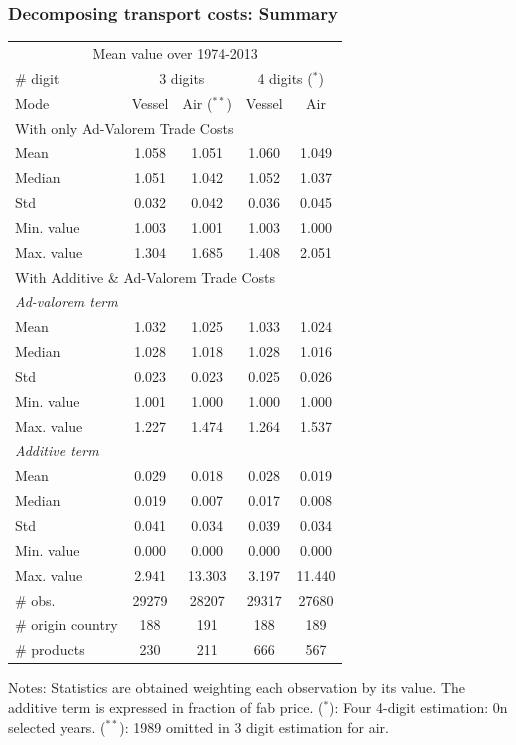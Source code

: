 \documentclass[10 pt,Helvetica, french]{beamer}
\begin{document}
\begin{frame}[label=app_results_summary]
\frametitle{Decomposing transport costs: Summary \hyperlink{slide_results_summary}{}}
\begin{table}[htbp]
  \centering
  \scriptsize{
  \begin{center}
    \begin{tabular}{l|cc|cc}
      \hline \hline
    \multicolumn{5}{c}{Mean value over 1974-2013}   \\
    \# digit & \multicolumn{2}{c}{3 digits} & \multicolumn{2}{c}{4 digits ($^\ast$)} \\ \hline
    Mode  & Vessel & Air ($^{\ast \ast}$) & Vessel & Air \\ \hline
    \multicolumn{5}{l}{With only Ad-Valorem Trade Costs }  \\ \hline
    Mean  & 1.058 & 1.051 & 1.060 & 1.049 \\
    Median & 1.051 & 1.042 & 1.052 & 1.037 \\
    Std   & 0.032 & 0.042 & 0.036 & 0.045 \\
    Min. value & 1.003 & 1.001 & 1.003 & 1.000 \\
    Max. value & 1.304 & 1.685 & 1.408 & 2.051 \\ \hline
    \multicolumn{5}{l}{With Additive \& Ad-Valorem Trade Costs } \\ \hline
   \textit{Ad-valorem term} & & & & \\ \hline
    Mean  & 1.032 & 1.025 & 1.033 & 1.024 \\
    Median & 1.028 & 1.018 & 1.028 & 1.016 \\
    Std   & 0.023 & 0.023 & 0.025 & 0.026 \\
    Min. value & 1.001 & 1.000 & 1.000 & 1.000 \\
    Max. value & 1.227 & 1.474 & 1.264 & 1.537 \\ \hline
    \textit{Additive term }& & & &   \\ \hline
    Mean  & 0.029 & 0.018 & 0.028 & 0.019 \\
    Median & 0.019 & 0.007 & 0.017 & 0.008 \\
    Std   & 0.041 & 0.034 & 0.039 & 0.034 \\
    Min. value & 0.000 & 0.000 & 0.000 & 0.000 \\
    Max. value & 2.941 & 13.303 & 3.197 & 11.440 \\ \hline
        \# obs. & 29279 & 28207 & 29317 & 27680 \\
    \# origin country & 188 & 191 & 188 & 189 \\
    \# products & 230 & 211 & 666 & 567 \\  \hline \hline
  \end{tabular}
    \end{center}}
\parbox[l]{8cm}{\tiny{Notes: Statistics are obtained weighting each observation by its value. The additive term is expressed in fraction of fab price. ($^\ast$): Four 4-digit estimation: 0n selected years. ($^{\ast \ast}$): 1989 omitted in 3 digit estimation for air.}}
\end{table}%
\end{frame}
\end{document}
